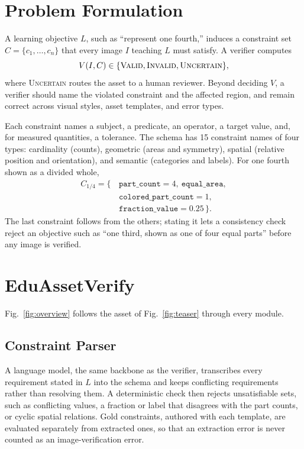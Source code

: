 \documentclass[conference]{IEEEtran}
\newcommand{\Valid}{\textsc{Valid}}
\newcommand{\Invalid}{\textsc{Invalid}}
\newcommand{\Uncertain}{\textsc{Uncertain}}
\newcommand{\cn}[1]{\texttt{#1}}
\begin{document}
\section{Problem Formulation}\label{sec:formulation}

A learning objective $L$, such as ``represent one fourth,'' induces a constraint set $C=\{c_1,\ldots,c_n\}$ that every image $I$ teaching $L$ must satisfy. A verifier computes
\begin{equation}
V(I,C)\in\{\Valid,\Invalid,\Uncertain\},\label{eq:task}
\end{equation}
where \Uncertain{} routes the asset to a human reviewer. Beyond deciding $V$, a verifier should name the violated constraint and the affected region, and remain correct across visual styles, asset templates, and error types.

Each constraint names a subject, a predicate, an operator, a target value, and, for measured quantities, a tolerance. The schema has 15 constraint names of four types: cardinality (counts), geometric (areas and symmetry), spatial (relative position and orientation), and semantic (categories and labels). For one fourth shown as a divided whole,
\begin{equation}
\begin{aligned}
C_{1/4}=\{\,&\cn{part\_count}=4,\ \cn{equal\_area},\\
&\cn{colored\_part\_count}=1,\\
&\cn{fraction\_value}=0.25\,\}.
\end{aligned}\label{eq:example}
\end{equation}
The last constraint follows from the others; stating it lets a consistency check reject an objective such as ``one third, shown as one of four equal parts'' before any image is verified.

\section{EduAssetVerify}\label{sec:method}

Fig.~\ref{fig:overview} follows the asset of Fig.~\ref{fig:teaser} through every module.


\subsection{Constraint Parser}\label{sec:parser}
A language model, the same backbone as the verifier, transcribes every requirement stated in $L$ into the schema and keeps conflicting requirements rather than resolving them. A deterministic check then rejects unsatisfiable sets, such as conflicting values, a fraction or label that disagrees with the part counts, or cyclic spatial relations. Gold constraints, authored with each template, are evaluated separately from extracted ones, so that an extraction error is never counted as an image-verification error.
\end{document}
